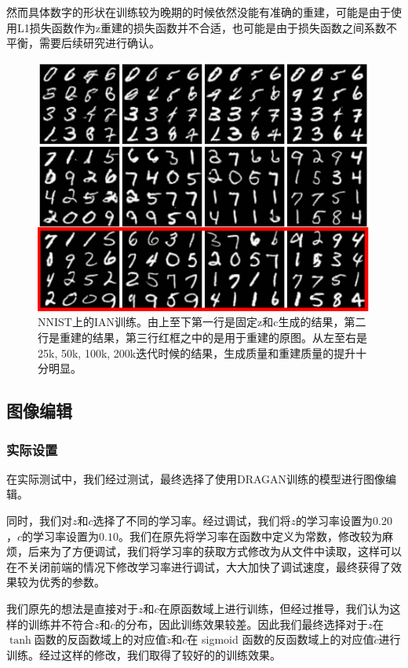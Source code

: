 \documentclass[a4paper,12pt,UTF8]{ctexart}
\newcommand{\kai}{\CJKfamily{zhkai}}	%
\begin{document}
然而具体数字的形状在训练较为晚期的时候依然没能有准确的重建，可能是由于使用L1损失函数作为z重建的损失函数并不合适，也可能是由于损失函数之间系数不平衡，需要后续研究进行确认。

\begin{figure}[H]
  \centering
  \includegraphics[width=1\linewidth]{figs/mnist.png}
  \caption{\kai NNIST上的IAN训练。由上至下第一行是固定z和c生成的结果，第二行是重建的结果，第三行红框之中的是用于重建的原图。从左至右是25k, 50k, 100k, 200k迭代时候的结果，生成质量和重建质量的提升十分明显。}
  \label{fig:mnist_ian}
\end{figure}


\subsection{图像编辑}

\subsubsection{实际设置}

在实际测试中，我们经过测试，最终选择了使用DRAGAN训练的模型进行图像编辑。

同时，我们对$z$和$c$选择了不同的学习率。经过调试，我们将$z$的学习率设置为$0.20$，$c$的学习率设置为$0.10$。我们在原先将学习率在函数中定义为常数，修改较为麻烦，后来为了方便调试，我们将学习率的获取方式修改为从文件中读取，这样可以在不关闭前端的情况下修改学习率进行调试，大大加快了调试速度，最终获得了效果较为优秀的参数。

我们原先的想法是直接对于$z$和$c$在原函数域上进行训练，但经过推导，我们认为这样的训练并不符合$z$和$c$的分布，因此训练效果较差。因此我们最终选择对于$z$在$\tanh$函数的反函数域上的对应值$\tilde z$和$c$在 sigmoid 函数的反函数域上的对应值$\tilde c$进行训练。经过这样的修改，我们取得了较好的的训练效果。
\end{document}
